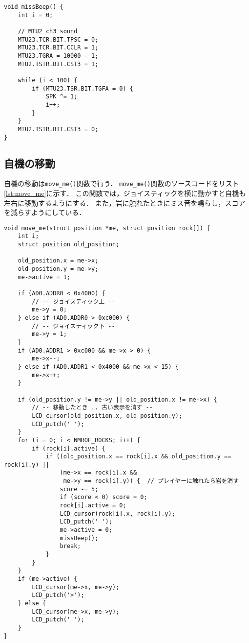 \documentclass[a4paper,11pt,dvipdfmx]{jsarticle}
\begin{document}
\begin{lstlisting}[caption=missBeep(), label=lst:missBeep]
  void missBeep() {
    int i = 0;

    // MTU2 ch3 sound
    MTU23.TCR.BIT.TPSC = 0;
    MTU23.TCR.BIT.CCLR = 1;
    MTU23.TGRA = 10000 - 1;
    MTU2.TSTR.BIT.CST3 = 1;

    while (i < 100) {
        if (MTU23.TSR.BIT.TGFA = 0) {
            SPK ^= 1;
            i++;
        }
    }
    MTU2.TSTR.BIT.CST3 = 0;
}

\end{lstlisting}

\subsection{自機の移動}
自機の移動は\texttt{move\_me()}関数で行う．
\texttt{move\_me()}関数のソースコードをリスト\ref{lst:move_me}に示す．
この関数では，ジョイスティックを横に動かすと自機も左右に移動するようにする．
また，岩に触れたときにミス音を鳴らし，スコアを減らすようにしている．

\begin{lstlisting}[caption=move\_me(), label=lst:move_me]
  void move_me(struct position *me, struct position rock[]) {
    int i;
    struct position old_position;

    old_position.x = me->x;
    old_position.y = me->y;
    me->active = 1;

    if (AD0.ADDR0 < 0x4000) {
        // -- ジョイスティック上 --
        me->y = 0;
    } else if (AD0.ADDR0 > 0xc000) {
        // -- ジョイスティック下 --
        me->y = 1;
    }
    if (AD0.ADDR1 > 0xc000 && me->x > 0) {
        me->x--;
    } else if (AD0.ADDR1 < 0x4000 && me->x < 15) {
        me->x++;
    }

    if (old_position.y != me->y || old_position.x != me->x) {
        // -- 移動したとき .. 古い表示を消す --
        LCD_cursor(old_position.x, old_position.y);
        LCD_putch(' ');
    }
    for (i = 0; i < NMROF_ROCKS; i++) {
        if (rock[i].active) {
            if ((old_position.x == rock[i].x && old_position.y == rock[i].y) ||
                (me->x == rock[i].x &&
                 me->y == rock[i].y)) {  // プレイヤーに触れたら岩を消す
                score -= 5;
                if (score < 0) score = 0;
                rock[i].active = 0;
                LCD_cursor(rock[i].x, rock[i].y);
                LCD_putch(' ');
                me->active = 0;
                missBeep();
                break;
            }
        }
    }
    if (me->active) {
        LCD_cursor(me->x, me->y);
        LCD_putch('>');
    } else {
        LCD_cursor(me->x, me->y);
        LCD_putch(' ');
    }
}
\end{lstlisting}
\end{document}
